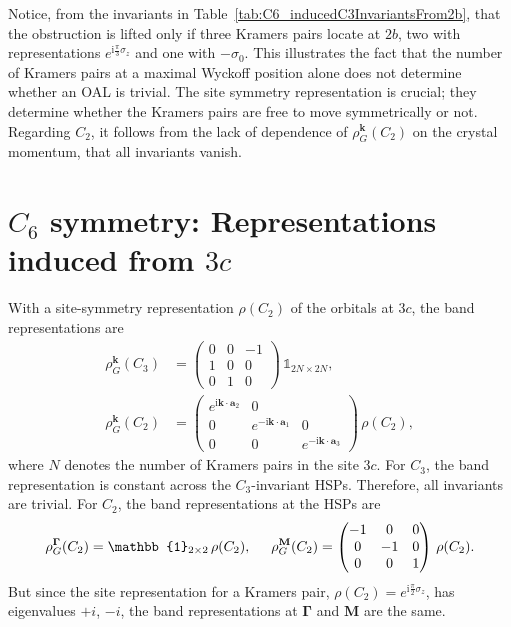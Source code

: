 {Notice, from the invariants in Table~\ref{tab:C6_inducedC3InvariantsFrom2b}, that the obstruction is lifted only if three Kramers pairs locate at $2b$, two with representations $e^{\mathrm{i}\frac{\pi}{3}\sigma_z}$ and one with $-\sigma_0$. This illustrates the fact that the number of Kramers pairs at a maximal Wyckoff position alone does not determine whether an OAL is trivial. The site symmetry representation is crucial; they determine whether the Kramers pairs are free to move symmetrically or not. Regarding $C_2$, it follows from the lack of dependence of $\rho_G^{\mathbf{k}}(C_2)$ on the crystal momentum, that all invariants vanish.

\vspace*{-1cm}
\section{$C_6$ symmetry: Representations induced from $3c$}
With a site-symmetry representation $\rho(C_2)$ of the orbitals at $3c$, the band representations are
\begin{equation}
\begin{aligned}
\rho_G^{\mathbf{k}}(C_3)&=
\begin{pmatrix}
0 & 0 & -1\\
1 & 0 & 0\\
0 & 1 & 0
\end{pmatrix}
\, \mathbb{1}_{2N \times 2N},\\
\rho_G^{\mathbf{k}}(C_2)&=
\begin{pmatrix}
e^{\mathrm{i} {\mathbf{k}} \cdot \mathbf{a}_2}& 0\\
0 & e^{-\mathrm{i} {\mathbf{k}} \cdot \mathbf{a}_1} &0\\
0 & 0 & e^{-\mathrm{i} {\mathbf{k}} \cdot \mathbf{a}_3}
\end{pmatrix} \,  \rho(C_2),
\end{aligned}
\end{equation}
where $N$ denotes the number of Kramers pairs in the site $3c$. For $C_3$, the band representation is constant across the $C_3$-invariant HSPs. Therefore, all invariants are trivial. 
For $C_2$, the band representations at the HSPs are
\begin{equation}
\rho_G^{\mathbf{\Gamma}}(C_2)=\mathbb{1}_{2 \times 2} \, \rho(C_2), \hspace*{0.5cm} \rho_G^{\mathbf{M}}(C_2)=
\begin{pmatrix}
-1 & 0 & 0\\
0 & -1 & 0\\
0 & 0 & 1
\end{pmatrix} \, \rho(C_2). 
\end{equation}
But since the site representation for a Kramers pair, $\rho(C_2)=e^{\mathrm{i} \frac{\pi}{2}\sigma_z}$, has eigenvalues $+i$, $-i$, the band representations at $\mathbf{\Gamma}$ and ${\mathbf{M}}$ are the same. 

}
